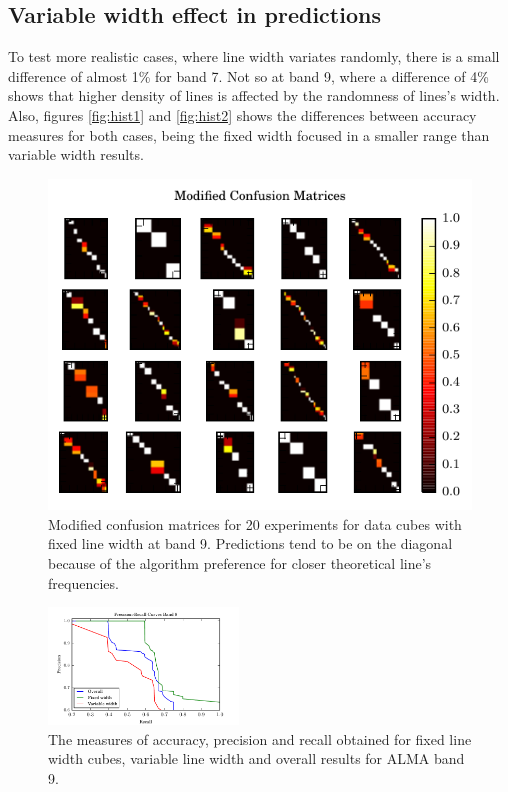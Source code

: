 \subsection{Variable width effect in predictions}
To test more realistic cases, where line width variates randomly, there is a small difference of almost 1\% for band 7.
Not so at band 9, where a difference of 4\% shows that higher density of lines is affected by the randomness of lines's width.
Also, figures \ref{fig:hist1} and \ref{fig:hist2} shows the differences between accuracy measures for both cases, being the fixed width focused in a smaller range than variable width results.

\begin{figure}
	\begin{center}
		\includegraphics[width=0.45 \textwidth]{images/confusion_matrix}
		\caption{ Modified confusion matrices for 20 experiments for data cubes with fixed line width at band 9. Predictions tend to be on the diagonal because of the algorithm preference for closer theoretical line's frequencies.}
		\label{fig:confusion_matrix}
	\end{center}
\end{figure}

\begin{figure}[H]
	\begin{center}
		\includegraphics[width=0.45\textwidth]{images/results1}
		\caption{ The measures of accuracy, precision and recall obtained for fixed line width cubes, variable line width and overall results for ALMA band 9.}
		\label{fig:results1}
	\end{center}
\end{figure}

